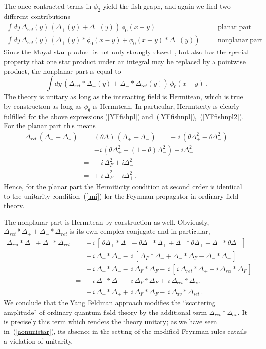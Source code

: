 \documentclass[a4paper,twoside,12pt]{article}
\begin{document}
The once contracted terms in $\phi_2$ yield the fish graph, and again
we find two different contributions,
\begin{eqnarray}
\int dy \, \Delta_{ret}(y)\,(\Delta_+(y)+\Delta_-(y))\,\phi_0(x-y)
&&\quad\mbox{planar part}\label{YFfishpl}\\
\int dy \, \Delta_{ret}(y)\,(\Delta_+(y)*\phi_0(x-y) 
+\phi_0(x-y)*\Delta_-(y))
&&\quad\mbox{nonplanar part}\qquad\label{YFfishnpl}
\end{eqnarray}
Since the Moyal star product 
is not only strongly closed~\cite{co}, but also 
has the special property that one star product under an integral may be
replaced by a pointwise product, the nonplanar part is equal to 
\begin{equation}\label{YFfishnpl2}
\int dy \, (\Delta_{ret}* \Delta_+(y)+\Delta_-*\Delta_{ret}(y)) 
\,\phi_0(x-y) \,.
\end{equation}
The theory is unitary as long as the interacting field is
Hermitean, which is true by construction as long as $\phi_0$ is Hermitean.
In particular, Hermiticity is clearly fulfilled for the above expressions
(\ref{YFfishpl}) and~(\ref{YFfishnpl}),~(\ref{YFfishnpl2}). 
For the planar part this means 
\begin{eqnarray*}
\Delta_{ret}\,(\Delta_++\Delta_-)&=&(\theta\Delta)\,(\Delta_++\Delta_-)\;
=\;-\,i\,(\theta\Delta_+^2-\theta\Delta_-^2)\\
&=&-i\,(\theta\Delta_+^2+(1-\theta)\Delta_-^2)+i\Delta_-^2\\
&=&-\,i\,\Delta_F^2+i\Delta_-^2\\
&=&
+\,i\,\bar\Delta_F^2-i\Delta_+^2\,.
\end{eqnarray*}
Hence, for the planar part the Hermiticity condition at second order is 
identical to the unitarity condition~(\ref{uni}) for the
Feynman propagator in ordinary field theory.

The nonplanar part is Hermitean by construction as well. Obviously,
$\Delta_{ret}* \Delta_++ \Delta_-*\Delta_{ret}$ is its own complex
conjugate and in particular, 
\begin{eqnarray*}
\Delta_{ret}* \Delta_++ \Delta_-*\Delta_{ret}&=&
-\,i\,[\,\theta\Delta_+*\Delta_+-\theta\Delta_-*\Delta_+
+\Delta_-*\theta\Delta_+-\Delta_-*\theta\Delta_-\,]
\\&=& +\,i\,\Delta_-*\Delta_-
-\,i\,[\,\Delta_F*\Delta_++\Delta_-*\Delta_F-\Delta_-*\Delta_+\,]
\\&=&
+\,i\,\Delta_-*\Delta_--\,i\,\Delta_F*\Delta_F
-\,i\,[\,i\,\Delta_{ret}*\Delta_+-i\,
\Delta_{ret}*\Delta_F\,]
\\&=&+\,i\,\Delta_-*\Delta_--\,i\,\Delta_F*\Delta_F
+\,i\,\Delta_{ret}*\Delta_{av}
\\&=&-\,i\,\Delta_+*\Delta_++\,i\,\bar\Delta_F*\bar\Delta_F
-\,i\,\Delta_{av}*\Delta_{ret}\,.
\end{eqnarray*}
We conclude that the Yang Feldman approach modifies the ``scattering
amplitude'' of ordinary quantum field theory by the additional term
$\Delta_{ret}*\Delta_{av}$. It is precisely this term which renders the
theory unitary; as we have seen in~(\ref{nonunistar}), its absence in the
setting of the modified Feynman rules entails a violation of unitarity.
\end{document}
